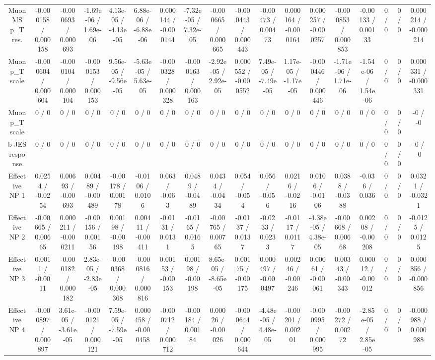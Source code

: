 \documentclass[10pt]{article}
\begin{document}
\begin{table}[htbp]
\begin{center}
\begin{tabular}{|c|c|c|c|c|c|c|c|c|c|c|c|c|c|c|c|c|c|}
  Muon MS p_{T} res. & -0.000158 / 0.000158 & -0.000693 / 0.000693 & -1.69e-06 / 1.69e-06 & 4.13e-05 / -4.13e-05 & 6.88e-06 / -6.88e-06 & 0.000144 / -0.000144 & -7.32e-05 / 7.32e-05 & -0.000665 / 0.000665 & -0.000443 / 0.000443 & -0.00473 / 0.00473 & 0.000164 / -0.000164 & 0.000257 / -0.000257 & -0.000853 / 0.000853 & -0.00133 / 0.00133 & 0 / 0 & 0 / 0 & 0.000214 / -0.000214 \\ 
  Muon p_{T} scale & -0.000604 / 0.000604 & -0.000104 / 0.000104 & -0.000153 / 0.000153 & 9.56e-05 / -9.56e-05 & -5.63e-05 / 5.63e-05 & -0.000328 / 0.000328 & -0.000163 / 0.000163 & -2.92e-05 / 2.92e-05 & 0.000552 / -0.000552 & 7.49e-05 / -7.49e-05 & 1.17e-05 / -1.17e-05 & -0.000446 / 0.000446 & -1.71e-06 / 1.71e-06 & -1.54e-06 / 1.54e-06 & 0 / 0 & 0 / 0 & 0.000331 / -0.000331 \\ 
  Muon p_{T} scale & 0 / 0 & 0 / 0 & 0 / 0 & 0 / 0 & 0 / 0 & 0 / 0 & 0 / 0 & 0 / 0 & 0 / 0 & 0 / 0 & 0 / 0 & 0 / 0 & 0 / 0 & 0 / 0 & 0 / 0 & 0 / 0 & -0 / -0 \\ 
  b JES response & 0 / 0 & 0 / 0 & 0 / 0 & 0 / 0 & 0 / 0 & 0 / 0 & 0 / 0 & 0 / 0 & 0 / 0 & 0 / 0 & 0 / 0 & 0 / 0 & 0 / 0 & 0 / 0 & 0 / 0 & 0 / 0 & -0 / -0 \\ 
  Effective NP 1 & 0.0254 / -0.0254 & 0.00693 / -0.00693 & 0.00489 / -0.00489 & -0.00178 / 0.00178 & -0.0106 / 0.0106 & 0.063 / -0.063 & 0.0489 / -0.0489 & 0.0434 / -0.0434 & 0.054 / -0.054 & 0.056 / -0.056 & 0.0216 / -0.0216 & 0.0106 / -0.0106 & 0.0388 / -0.0388 & -0.036 / 0.036 & 0 / 0 & 0 / 0 & 0.0321 / -0.0321 \\ 
  Effective NP 2 & -0.00665 / 0.00665 & 0.000211 / -0.000211 & -0.00156 / 0.00156 & 0.00198 / -0.00198 & 0.00411 / -0.00411 & -0.0131 / 0.0131 & -0.0165 / 0.0165 & -0.00765 / 0.00765 & -0.0137 / 0.0137 & -0.0233 / 0.0233 & -0.0117 / 0.0117 & -4.38e-05 / 4.38e-05 & -0.00668 / 0.00668 & 0.00208 / -0.00208 & 0 / 0 & 0 / 0 & -0.0125 / 0.0125 \\ 
  Effective NP 3 & 0.0011 / -0.0011 & -0.000182 / 0.000182 & 2.83e-05 / -2.83e-05 & -0.000368 / 0.000368 & -0.000816 / 0.000816 & 0.00153 / -0.00153 & 0.00198 / -0.00198 & 8.65e-05 / -8.65e-05 & 0.00175 / -0.00175 & 0.000497 / -0.000497 & 0.00246 / -0.00246 & 0.00061 / -0.00061 & 0.00343 / -0.00343 & 0.00012 / -0.00012 & 0 / 0 & 0 / 0 & 0.000856 / -0.000856 \\ 
  Effective NP 4 & -0.000897 / 0.000897 & 3.61e-05 / -3.61e-05 & -0.000121 / 0.000121 & 7.59e-05 / -7.59e-05 & 0.000458 / -0.000458 & -0.000712 / 0.000712 & -0.00184 / 0.00184 & 0.00026 / -0.00026 & -0.000644 / 0.000644 & -4.48e-05 / 4.48e-05 & -0.00201 / 0.00201 & -0.000995 / 0.000995 & -0.00272 / 0.00272 & -2.85e-05 / 2.85e-05 & 0 / 0 & 0 / 0 & -0.000988 / 0.000988 \\ 

\end{tabular}
\end{center}
\end{table}
\end{document}
